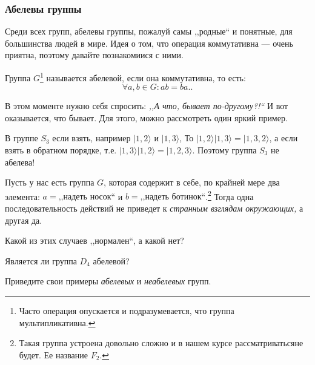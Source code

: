 \setcounter{footnote}{0}
\subsubsection{Абелевы группы}
Среди всех групп, абелевы группы, пожалуй самы ,,родные`` и понятные, для большинства людей в мире. Идея о том, что операция коммутативна --- очень приятна, поэтому давайте познакомиися с ними. 

\begin{definition}
    Группа $G$\footnote{Часто операция опускается и подразумевается, что группа мультипликативна.} 
    называется абелевой, если она коммутативна, то есть: \[
        \forall a, b \in G: ab = ba.
    .\] 
\end{definition}

\setcounter{footnote}{1}
В этом моменте нужно себя спросить: \emph{,,А что, бывает по-другому?!``} И вот оказывается, что бывает.
Для этого, можно рассмотреть один яркий пример. 

\begin{example}
    В группе $S_3$ если взять, например $|1, 2 \rangle$ и $| 1, 3 \rangle$, То $| 1, 2 \rangle |1, 3 \rangle  = | 1, 3, 2 \rangle$, а если взять в обратном порядке, т.е. $| 1, 3 \rangle | 1, 2 \rangle = | 1, 2, 3 \rangle$. Поэтому группа $S_3$ не абелева!
\end{example}

\begin{example}
    Пусть у нас есть группа $G$, которая содержит в себе, по крайней мере два элемента: 
    $a = \text{,,надеть носок``}$ и $b = \text{,,надеть ботинок``}$.\footnote{
    Такая группа устроена довольно сложно и в нашем курсе рассматриватьсяне будет. Ее название $F_2$.}
    Тогда одна последовательность действий не приведет к \emph{странным взглядам окружающих,} а другая да.
\end{example}


\begin{practice}
   Какой из этих случаев ,,нормален``, а какой нет? 
\end{practice}

\begin{practice}
    Является ли группа $D_4$ абелевой?
\end{practice}

\begin{practice}
    Приведите свои примеры \emph{абелевых} и \emph{неабелевых} групп. 
\end{practice}

